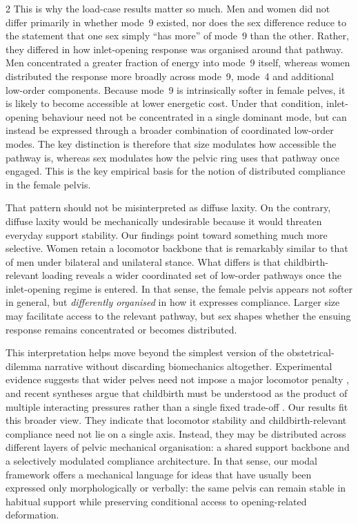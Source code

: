 \documentclass[openacc]{rsproca_new}
\begin{document}
\begin{multicols}{2}
This is why the load-case results matter so much. Men and women did not differ primarily in whether mode~9 existed, nor does the sex difference reduce to the statement that one sex simply ``has more'' of mode~9 than the other. Rather, they differed in how inlet-opening response was organised around that pathway. Men concentrated a greater fraction of energy into mode~9 itself, whereas women distributed the response more broadly across mode~9, mode~4 and additional low-order components. Because mode~9 is intrinsically softer in female pelves, it is likely to become accessible at lower energetic cost. Under that condition, inlet-opening behaviour need not be concentrated in a single dominant mode, but can instead be expressed through a broader combination of coordinated low-order modes. The key distinction is therefore that size modulates how accessible the pathway is, whereas sex modulates how the pelvic ring uses that pathway once engaged. This is the key empirical basis for the notion of distributed compliance in the female pelvis.

That pattern should not be misinterpreted as diffuse laxity. On the contrary, diffuse laxity would be mechanically undesirable because it would threaten everyday support stability. Our findings point toward something much more selective. Women retain a locomotor backbone that is remarkably similar to that of men under bilateral and unilateral stance. What differs is that childbirth-relevant loading reveals a wider coordinated set of low-order pathways once the inlet-opening regime is entered. In that sense, the female pelvis appears not softer in general, but \emph{differently organised} in how it expresses compliance. Larger size may facilitate access to the relevant pathway, but sex shapes whether the ensuing response remains concentrated or becomes distributed.

This interpretation helps move beyond the simplest version of the obstetrical-dilemma narrative without discarding biomechanics altogether. Experimental evidence suggests that wider pelves need not impose a major locomotor penalty \cite{Warrener2015}, and recent syntheses argue that childbirth must be understood as the product of multiple interacting pressures rather than a single fixed trade-off \cite{Pavlicev2020,Haeusler2021,Grunstra2023}. Our results fit this broader view. They indicate that locomotor stability and childbirth-relevant compliance need not lie on a single axis. Instead, they may be distributed across different layers of pelvic mechanical organisation: a shared support backbone and a selectively modulated compliance architecture. In that sense, our modal framework offers a mechanical language for ideas that have usually been expressed only morphologically or verbally: the same pelvis can remain stable in habitual support while preserving conditional access to opening-related deformation.


\end{multicols}
\end{document}

